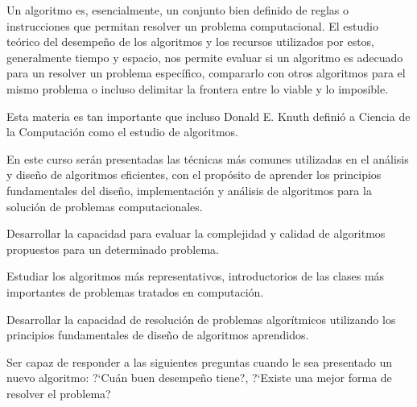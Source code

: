 \begin{syllabus}


\begin{justification}

    Un algoritmo es, esencialmente, un conjunto bien definido de reglas o instrucciones
    que permitan resolver un problema computacional. El estudio teórico del desempeño
    de los algoritmos y los recursos utilizados por estos, generalmente tiempo y espacio, 
    nos permite evaluar si un algoritmo es adecuado para un resolver un problema 
    específico, compararlo con otros algoritmos para el mismo problema o incluso
    delimitar la frontera entre lo viable y lo imposible.
    
    Esta materia es tan importante que incluso Donald E. Knuth definió a
    Ciencia de la Computación como el estudio de algoritmos.
    
    En este curso serán presentadas las técnicas más comunes utilizadas en el análisis y diseño de 
    algoritmos eficientes, con el propósito de aprender los principios fundamentales
    del diseño, implementación y análisis de algoritmos para la solución de problemas
    computacionales.
    \end{justification}
    
    \begin{goals} 
    \item Desarrollar la capacidad para evaluar la complejidad y calidad de algoritmos propuestos para un determinado problema.
    \item Estudiar los algoritmos más representativos, introductorios de las clases más importantes de problemas tratados en computación.
    \item Desarrollar la capacidad de resolución de problemas algorítmicos utilizando los principios fundamentales de diseño de algoritmos aprendidos.
    \item Ser capaz de responder a las siguientes preguntas cuando le sea presentado un nuevo algoritmo: ?`Cuán buen desempeño tiene?, ?`Existe una mejor forma de resolver el problema?
    \end{goals}
    
  
    

\end{syllabus}
